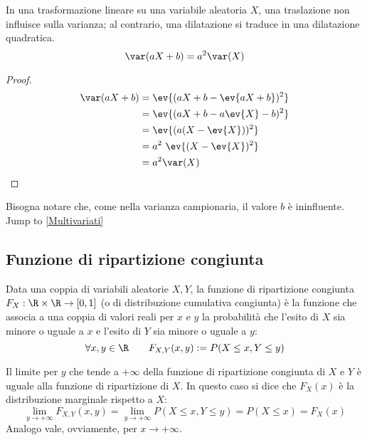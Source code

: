 \begin{prop}
	In una trasformazione lineare su una variabile aleatoria $X$, una traslazione non influisce sulla varianza; al contrario, una dilatazione si traduce in una dilatazione quadratica.
	\begin{equation*}
		\var(aX+b)=a^2\var(X)
	\end{equation*}
\end{prop}
\begin{proof}
	\begin{align*}
		\var(aX+b) & = \ev{(aX+b-\ev{aX+b})^2} \\
		           & = \ev{(aX+b-a\ev{X}-b)^2} \\
		           & = \ev{(a(X-\ev{X}))^2}    \\
		           & = a^2~\ev{(X-\ev{X})^2}   \\
		           & = a^2 \var(X)             \\
	\end{align*}
\end{proof}
Bisogna notare che, come nella varianza campionaria, il valore $b$ è ininfluente.\\
Jump to \ref{Multivariati}


\subsection{Funzione di ripartizione congiunta}
\begin{defin}
	Data una coppia di variabili aleatorie $X, Y$, la funzione di ripartizione congiunta $F_X:\R\times\R\to[0,1]$ (o di distribuzione cumulativa congiunta) è la funzione che associa a una coppia di valori reali per $x$ e $y$ la probabilità che l'esito di $X$ sia minore o uguale a $x$ e l'esito di $Y$ sia minore o uguale a $y$:
	\begin{equation*}
		\forall x,y\in\R\qquad F_{X,Y}(x,y):=P(X\leq x, Y\leq y) \\
	\end{equation*}
\end{defin}

Il limite per $y$ che tende a $+\infty$ della funzione di ripartizione congiunta di $X$ e $Y$ è uguale alla funzione di ripartizione di $X$. In questo caso si dice che $F_X(x)$ è la distribuzione marginale rispetto a $X$:
\begin{equation} \label{eq:distrmargin}
	\lim_{y\to+\infty}F_{X,Y}(x, y) = \lim_{y\to+\infty}P(X\leq x,Y\leq y) = P(X\leq x) = F_X(x)
\end{equation}
Analogo vale, ovviamente, per $x\to+\infty$.



